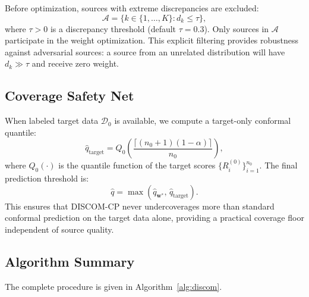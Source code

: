 \documentclass{article}
\newcommand{\calD}{\mathcal{D}}
\newcommand{\qhat}{\widehat{q}}
\newcommand{\DISCOM}{\textsc{DISCOM-CP}}
\begin{document}
Before optimization, sources with extreme discrepancies are excluded:
\begin{equation}
\label{eq:filtering}
\mathcal{A} = \{k \in \{1, \ldots, K\} : d_k \leq \tau\},
\end{equation}
where $\tau > 0$ is a discrepancy threshold (default $\tau = 0.3$). Only sources in $\mathcal{A}$ participate in the weight optimization. This explicit filtering provides robustness against adversarial sources: a source from an unrelated distribution will have $d_k \gg \tau$ and receive zero weight.

\subsection{Coverage Safety Net}
\label{sec:safety_net}

When labeled target data $\calD_0$ is available, we compute a target-only conformal quantile:
\begin{equation}
\label{eq:safety_net}
\qhat_{\text{target}} = Q_{0}\left(\frac{\lceil (n_0 + 1)(1 - \alpha) \rceil}{n_0}\right),
\end{equation}
where $Q_0(\cdot)$ is the quantile function of the target scores $\{R_i^{(0)}\}_{i=1}^{n_0}$. The final prediction threshold is:
\begin{equation}
\label{eq:final_threshold}
\qhat = \max\left(\qhat_{\mathbf{w}^*}, \, \qhat_{\text{target}}\right).
\end{equation}
This ensures that \DISCOM{} never undercoverages more than standard conformal prediction on the target data alone, providing a practical coverage floor independent of source quality.

\subsection{Algorithm Summary}

The complete procedure is given in Algorithm~\ref{alg:discom}.
\end{document}
